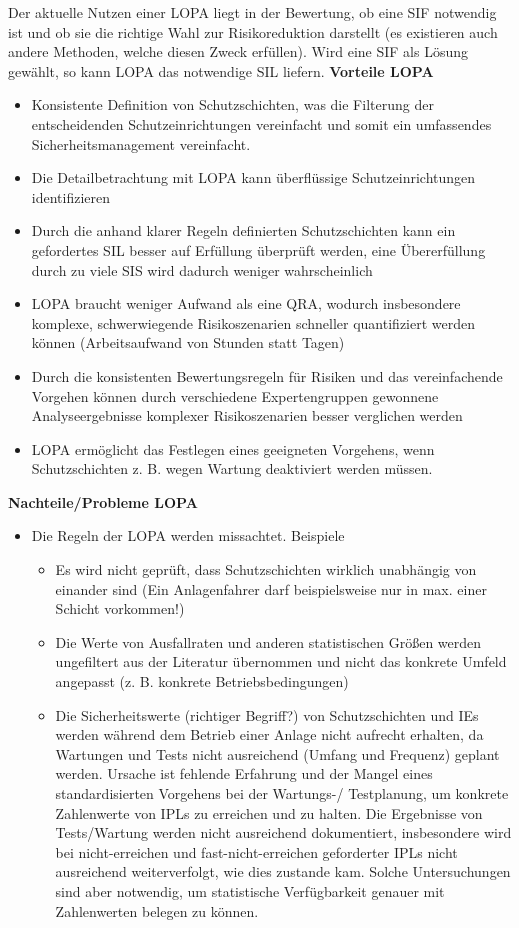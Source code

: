 Der aktuelle Nutzen einer LOPA liegt in der Bewertung, ob eine SIF notwendig ist und ob sie die richtige Wahl zur Risikoreduktion darstellt (es existieren auch andere Methoden, welche diesen Zweck erf\"ullen). Wird eine SIF als L\"osung gew\"ahlt, so kann LOPA das notwendige SIL liefern. \textbf{Vorteile LOPA}\begin{itemize}
\item Konsistente Definition von Schutzschichten, was die Filterung der entscheidenden Schutzeinrichtungen vereinfacht und somit ein umfassendes Sicherheitsmanagement vereinfacht. \item Die Detailbetrachtung mit LOPA kann \"uberfl\"ussige Schutzeinrichtungen identifizieren
\item Durch die anhand klarer Regeln definierten Schutzschichten kann ein gefordertes SIL besser auf Erf\"ullung \"uberpr\"uft werden, eine \"Ubererf\"ullung durch zu viele SIS wird dadurch weniger wahrscheinlich
\item LOPA braucht weniger Aufwand als eine QRA, wodurch insbesondere komplexe, schwerwiegende Risikoszenarien schneller quantifiziert werden k\"onnen (Arbeitsaufwand von Stunden statt Tagen)
\item Durch die konsistenten Bewertungsregeln f\"ur Risiken und das vereinfachende Vorgehen k\"onnen durch verschiedene Expertengruppen gewonnene Analyseergebnisse komplexer Risikoszenarien besser verglichen werden 
\item LOPA erm\"oglicht das Festlegen eines geeigneten Vorgehens, wenn Schutzschichten z. B. wegen Wartung deaktiviert werden m\"ussen.
\end{itemize} \textbf{Nachteile/Probleme LOPA} \begin{itemize}
\item Die Regeln der LOPA werden missachtet. Beispiele \begin{itemize}
  \item Es wird nicht gepr\"uft, dass Schutzschichten wirklich unabh\"angig von einander sind (Ein Anlagenfahrer darf beispielsweise nur in max. einer Schicht vorkommen!)
  \item Die Werte von Ausfallraten und anderen statistischen Gr\"o\ss{}en werden ungefiltert aus der Literatur \"ubernommen und nicht das konkrete Umfeld angepasst (z. B. konkrete Betriebsbedingungen)
  \item Die Sicherheitswerte (richtiger Begriff?) von Schutzschichten und IEs werden w\"ahrend dem Betrieb einer Anlage nicht aufrecht erhalten, da Wartungen und Tests nicht ausreichend (Umfang und Frequenz) geplant werden. Ursache ist fehlende Erfahrung und der Mangel eines standardisierten Vorgehens bei der Wartungs-/ Testplanung, um konkrete Zahlenwerte von IPLs zu erreichen und zu halten. Die Ergebnisse von Tests/Wartung werden nicht ausreichend dokumentiert, insbesondere wird bei nicht-erreichen und fast-nicht-erreichen geforderter IPLs nicht ausreichend weiterverfolgt, wie dies zustande kam. Solche Untersuchungen sind aber notwendig, um statistische Verf\"ugbarkeit genauer mit Zahlenwerten belegen zu k\"onnen. 

\end{itemize}
\end{itemize}
